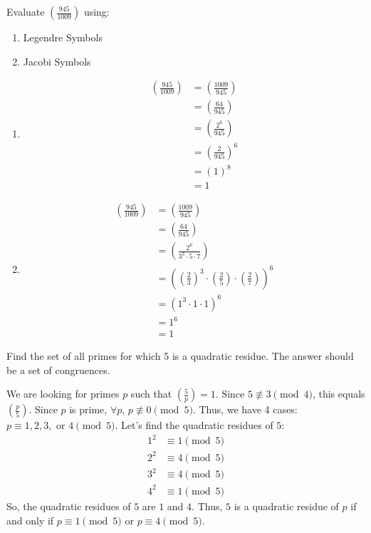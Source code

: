 \documentclass{article}
\newcommand{\legendre}[2]{\left(\frac{#1}{#2}\right)}
\begin{document}
\begin{problem}{}{}
    Evaluate $\left(\frac{945}{1009}\right)$ using:
    \begin{enumerate}[label=\textbf{(\alph*)}]
        \item Legendre Symbols
        \item Jacobi Symbols
    \end{enumerate}
\end{problem}
\begin{solution}{}{}
    \begin{enumerate}[label=\textbf{(\alph*)}]
        \item 
        \begin{align*}
            \legendre{945}{1009} &= \legendre{1009}{945}\\
            &=\legendre{64}{945}\\
            &=\legendre{2^6}{945}\\
            &=\legendre{2}{945}^6\\
            &=(1)^8\\
            &=1
        \end{align*}    
        \item 
        \begin{align*}
            \legendre{945}{1009} &= \legendre{1009}{945}\\
            &=\legendre{64}{945}\\
            &=\legendre{2^6}{3^3\cdot5\cdot7}\\
            &={\left(\legendre{2}{3}^3\cdot\legendre{2}{5}\cdot\legendre{2}{7}\right)}^6\\
            &={\left(1^3\cdot1\cdot1\right)}^6\\
            &=1^6\\
            &=1
        \end{align*}
    \end{enumerate}
\end{solution}

\begin{problem}{}{}
    Find the set of all primes for which 5 is a quadratic residue. The answer should be a set of congruences.
\end{problem}
\begin{solution}{}{}
    We are looking for primes $p$ such that $\legendre{5}{p}=1$. Since $5\not\equiv 3\pmod{4}$, this equals ${\legendre{p}{5}}$. Since $p$ is prime, $\forall p$, $p\not\equiv 0\pmod{5}$. Thus, we have 4 cases: $p\equiv 1,2,3,\text{ or }4\pmod{5}$. Let's find the quadratic residues of $5$:
    \begin{align*}
        1^2 &\equiv 1\pmod{5}\\
        2^2 &\equiv 4\pmod{5}\\
        3^2 &\equiv 4\pmod{5}\\
        4^2 &\equiv 1\pmod{5}
    \end{align*}
    So, the quadratic residues of $5$ are $1$ and $4$. Thus, $5$ is a quadratic residue of $p$ if and only if $p\equiv 1\pmod{5}$ or $p\equiv 4\pmod{5}$.
\end{solution}
\end{document}
